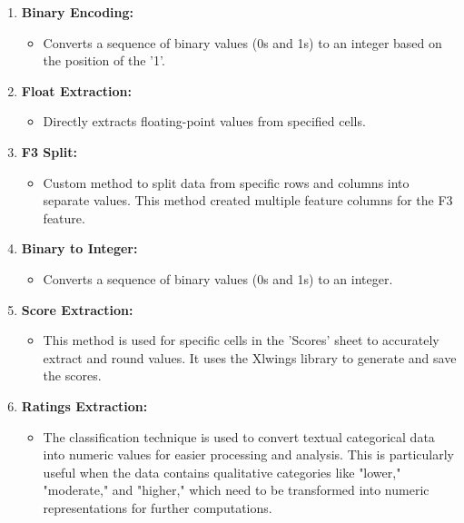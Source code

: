 \documentclass[12pt,letterpaper]{article}
\begin{document}
\begin{enumerate}
    \item \textbf{Binary Encoding:}
    \begin{itemize}
        \item Converts a sequence of binary values (0s and 1s) to an integer based on the position of the '1'.
    \end{itemize}

    \item \textbf{Float Extraction:}
    \begin{itemize}
        \item Directly extracts floating-point values from specified cells.
    \end{itemize}

    \item \textbf{F3 Split:}
    \begin{itemize}
        \item Custom method to split data from specific rows and columns into separate values. This method created multiple feature columns for the F3 feature.
    \end{itemize}

    \item \textbf{Binary to Integer:}
    \begin{itemize}
        \item Converts a sequence of binary values (0s and 1s) to an integer.
    \end{itemize}

    \item \textbf{Score Extraction:}
    \begin{itemize}
        \item This method is used for specific cells in the 'Scores' sheet to accurately extract and round values. It uses the Xlwings library to generate and save the scores.
    \end{itemize}

    \item \textbf{Ratings Extraction:}
    \begin{itemize}
        \item The classification technique is used to convert textual categorical data into numeric values for easier processing and analysis. This is particularly useful when the data contains qualitative categories like "lower," "moderate," and "higher," which need to be transformed into numeric representations for further computations.
    \end{itemize}
\end{enumerate}
\end{document}
